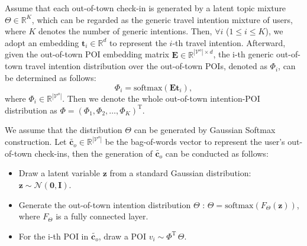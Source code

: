 \documentclass[letterpaper]{article} %
\begin{document}
Assume that each out-of-town check-in is generated by a latent topic mixture $\Theta \in \mathbb{R}^K$, which can be regarded as the generic travel intention mixture of users, where $K$ denotes the number of generic intentions.
Then, $\forall i$ ($1 \leq i \leq K$), we adopt an embedding $\mathbf{t}_i \in \mathbb{R}^d$ to represent the $i$-th travel intention. 
Afterward, given the out-of-town POI embedding matrix $\mathbf{E} \in \mathbb{R}^{|\mathcal{V}^o| \times d}$, 
the i-th generic out-of-town travel intention distribution over the out-of-town POIs, denoted as $\Phi_i$, can be determined as follows:
%
\begin{equation}\label{e:phi}
    \Phi_i = \mathrm{softmax}\left(\mathbf{E}\mathbf{t}_i\right)  ,
\end{equation}
%
where $\Phi_i \in \mathbb{R}^{ |\mathcal{V}^o| }$. 
Then we denote the whole out-of-town intention-POI distribution as $\Phi=\left(\Phi_1,\Phi_2,\ldots,\Phi_{K}\right)^\mathrm{T}$.

We assume that the distribution $\Theta$ can be generated by Gaussian Softmax construction. 
Let $\widetilde{\mathbf{c}_o} \in \mathbb{R}^{|\mathcal{V}^o|}$ be the bag-of-words vector to represent the user's out-of-town check-ins, then the generation of $\widetilde{\mathbf{c}_o}$ can be conducted as follows:
%
\begin{itemize}
    \item 
    Draw a latent variable $\mathbf{z}$ from a standard Gaussian distribution: 
    $\mathbf{z} \sim \mathcal{N}\left(\mathbf{0},\mathbf{I}\right)$.
    
    \item
    Generate the out-of-town intention distribution $ \Theta $ : 
    $\Theta = \mathrm{softmax} \left(F_{\Theta}\left(\mathbf{z}\right)\right)$, where $F_{\Theta}$ is a fully connected layer.
    
    \item
    For the i-th POI in $\widetilde{\mathbf{c}_o}$, draw a POI $v_i \sim {\Phi}^\mathrm{T} \, \Theta $.
\end{itemize}
\end{document}
